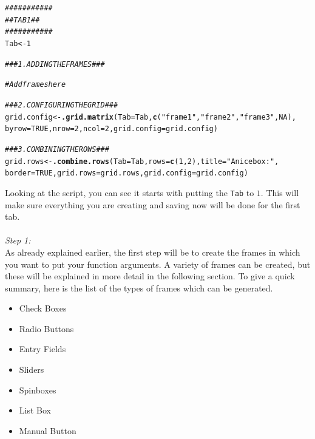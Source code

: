 \documentclass[a4paper]{article}\usepackage[]{graphicx}\usepackage[]{color}
\makeatletter
\newcommand{\hlnum}[1]{\textcolor[rgb]{0.686,0.059,0.569}{#1}}%
\newcommand{\hlstr}[1]{\textcolor[rgb]{0.192,0.494,0.8}{#1}}%
\newcommand{\hlcom}[1]{\textcolor[rgb]{0.678,0.584,0.686}{\textit{#1}}}%
\newcommand{\hlstd}[1]{\textcolor[rgb]{0.345,0.345,0.345}{#1}}%
\newcommand{\hlkwb}[1]{\textcolor[rgb]{0.69,0.353,0.396}{#1}}%
\newcommand{\hlkwc}[1]{\textcolor[rgb]{0.333,0.667,0.333}{#1}}%
\newcommand{\hlkwd}[1]{\textcolor[rgb]{0.737,0.353,0.396}{\textbf{#1}}}%
\newenvironment{kframe}{%
 \def\at@end@of@kframe{}%
 \ifinner\ifhmode%
  \def\at@end@of@kframe{\end{minipage}}%
  \begin{minipage}{\columnwidth}%
 \fi\fi%
 \def\FrameCommand##1{\hskip\@totalleftmargin \hskip-\fboxsep
 \colorbox{shadecolor}{##1}\hskip-\fboxsep
     \hskip-\linewidth \hskip-\@totalleftmargin \hskip\columnwidth}%
 \MakeFramed {\advance\hsize-\width
   \@totalleftmargin\z@ \linewidth\hsize
   \@setminipage}}%
 {\par\unskip\endMakeFramed%
 \at@end@of@kframe}
\newenvironment{knitrout}{}{} %
\makeatother
\begin{document}
\begin{knitrout}
\color{fgcolor}\begin{kframe}
\begin{alltt}
\hlcom{###########}
\hlcom{## TAB 1 ##}
\hlcom{###########}
\hlstd{Tab} \hlkwb{<-} \hlnum{1}

\hlcom{### 1. ADDING THE FRAMES ###}

\hlcom{# Add frames here}


\hlcom{### 2. CONFIGURING THE GRID ###}
\hlstd{grid.config} \hlkwb{<-} \hlkwd{.grid.matrix}\hlstd{(}\hlkwc{Tab}\hlstd{=Tab,}\hlkwd{c}\hlstd{(}\hlstr{"frame1"}\hlstd{,}\hlstr{"frame2"}\hlstd{,}\hlstr{"frame3"}\hlstd{,}\hlnum{NA}\hlstd{),}
                \hlkwc{byrow}\hlstd{=}\hlnum{TRUE}\hlstd{,}\hlkwc{nrow}\hlstd{=}\hlnum{2}\hlstd{,}\hlkwc{ncol}\hlstd{=}\hlnum{2}\hlstd{,}\hlkwc{grid.config}\hlstd{=grid.config)}


\hlcom{### 3. COMBINING THE ROWS ###}
\hlstd{grid.rows} \hlkwb{<-} \hlkwd{.combine.rows}\hlstd{(}\hlkwc{Tab}\hlstd{=Tab,}\hlkwc{rows}\hlstd{=}\hlkwd{c}\hlstd{(}\hlnum{1}\hlstd{,}\hlnum{2}\hlstd{),}\hlkwc{title}\hlstd{=}\hlstr{"A nice box: "}\hlstd{,}
                \hlkwc{border}\hlstd{=}\hlnum{TRUE}\hlstd{,}\hlkwc{grid.rows}\hlstd{=grid.rows,}\hlkwc{grid.config}\hlstd{=grid.config)}
\end{alltt}
\end{kframe}
\end{knitrout}
\noindent Looking at the script, you can see it starts with putting the
\verb|Tab| to $1$. This will make sure everything you are
creating and saving now will be done for the first tab. \\ \\
{\it Step 1:}\\
As already explained earlier, the first step will be to create the frames in
which you want to put your function arguments. A variety of frames can be
created, but these will be explained in more detail in the following section. To
give a quick summary, here is the list of the types of frames which can be
generated.
\begin{itemize}
  \item Check Boxes
  \item Radio Buttons
  \item Entry Fields
  \item Sliders
  \item Spinboxes
  \item List Box
  \item Manual Button
\end{itemize}
\end{document}
